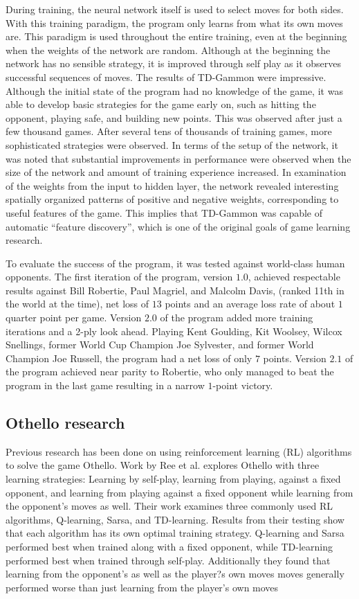 \documentclass{sig-alternate-05-2015}
\begin{document}
During training, the neural network itself is used to select moves for both sides. With this training paradigm, the program only learns from what its own moves are. This paradigm is used throughout the entire training, even at the beginning when the weights of the network are random. Although at the beginning the network has no sensible strategy, it is improved through self play as it observes successful sequences of moves.
The results of TD-Gammon were impressive. Although the initial state of the program had no knowledge of the game, it was able to develop basic strategies for the game early on, such as hitting the opponent, playing safe, and building new points. This was observed after just a few thousand games. After several tens of thousands of training games, more sophisticated strategies were observed. In terms of the setup of the network, it was noted that substantial improvements in performance were observed when the size of the network and amount of training experience increased.
In examination of the weights from the input to hidden layer, the network revealed interesting spatially organized patterns of positive and negative weights, corresponding to useful features of the game. This implies that TD-Gammon was capable of automatic ``feature discovery'', which is one of the original goals of game learning research.

To evaluate the success of the program, it was tested against world-class human opponents. The first iteration of the program, version $1.0$, achieved respectable results against Bill Robertie, Paul Magriel, and Malcolm Davis, (ranked 11th in the world at the time), net loss of $13$ points and an average loss rate of about $1$ quarter point per game. Version $2.0$ of the program added more training iterations and a 2-ply look ahead. Playing Kent Goulding, Kit Woolsey, Wilcox Snellings, former World Cup Champion Joe Sylvester, and former World Champion Joe Russell, the program had a net loss of only $7$ points. Version $2.1$ of the program achieved near parity to Robertie, who only managed to beat the program in the last game resulting in a narrow $1$-point victory.

\subsection{Othello research}

Previous research has been done on using reinforcement learning (RL) algorithms to solve the game Othello. Work by Ree et al. explores Othello with three learning strategies: Learning by self-play, learning from playing, against a fixed opponent, and learning from playing against a fixed opponent while learning from the opponent's moves as well. Their work examines three commonly used RL algorithms, Q-learning, Sarsa, and TD-learning. Results from their testing show that each algorithm has its own optimal training strategy. Q-learning and Sarsa performed best when trained along with a fixed opponent, while TD-learning performed best when trained through self-play. Additionally they found that learning from the opponent's as well as the player?s own moves moves generally performed worse than just learning from the player's own moves
\end{document}
